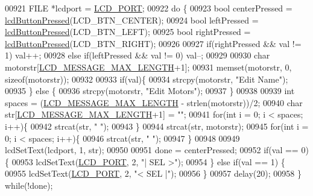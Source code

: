 \begin{DoxyCode}
{{{{{{{{{{{{{{00921     FILE *lcdport = \hyperlink{lcdmsg_8h_abcf42bd88b3c36193f301ca25b033875}{LCD\_PORT};
00922     \textcolor{keywordflow}{do} \{
00923         \textcolor{keywordtype}{bool} centerPressed = \hyperlink{lcddiag_8h_a74e4c744db49f9b7b645095575e152ad}{lcdButtonPressed}(LCD\_BTN\_CENTER);
00924         \textcolor{keywordtype}{bool} leftPressed = \hyperlink{lcddiag_8h_a74e4c744db49f9b7b645095575e152ad}{lcdButtonPressed}(LCD\_BTN\_LEFT);
00925         \textcolor{keywordtype}{bool} rightPressed = \hyperlink{lcddiag_8h_a74e4c744db49f9b7b645095575e152ad}{lcdButtonPressed}(LCD\_BTN\_RIGHT);
00926 
00927         \textcolor{keywordflow}{if}(rightPressed && val != 1) val++;
00928         \textcolor{keywordflow}{else} \textcolor{keywordflow}{if}(leftPressed && val != 0) val--;
00929 
00930         \textcolor{keywordtype}{char} motorstr[\hyperlink{lcdmsg_8h_abe4c4b70fc6f44ae3680e5b2c68cdd00}{LCD\_MESSAGE\_MAX\_LENGTH}+1];
00931         memset(motorstr, 0, \textcolor{keyword}{sizeof}(motorstr));
00932 
00933         \textcolor{keywordflow}{if}(val)\{
00934             strcpy(motorstr, \textcolor{stringliteral}{"Edit Name"});
00935         \} \textcolor{keywordflow}{else} \{
00936             strcpy(motorstr, \textcolor{stringliteral}{"Edit Motors"});
00937         \}
00938 
00939         \textcolor{keywordtype}{int} spaces = (\hyperlink{lcdmsg_8h_abe4c4b70fc6f44ae3680e5b2c68cdd00}{LCD\_MESSAGE\_MAX\_LENGTH} - strlen(motorstr))/2;
00940         \textcolor{keywordtype}{char} str[\hyperlink{lcdmsg_8h_abe4c4b70fc6f44ae3680e5b2c68cdd00}{LCD\_MESSAGE\_MAX\_LENGTH}+1] = \textcolor{stringliteral}{""};
00941         \textcolor{keywordflow}{for}(\textcolor{keywordtype}{int} i = 0; i < spaces; i++)\{
00942             strcat(str, \textcolor{stringliteral}{" "});
00943         \}
00944         strcat(str, motorstr);
00945         \textcolor{keywordflow}{for}(\textcolor{keywordtype}{int} i = 0; i < spaces; i++)\{
00946             strcat(str, \textcolor{stringliteral}{" "});
00947         \}
00948 
00949         lcdSetText(lcdport, 1, str);
00950 
00951         done = centerPressed;
00952         \textcolor{keywordflow}{if}(val == 0)\{
00953             lcdSetText(\hyperlink{lcdmsg_8h_abcf42bd88b3c36193f301ca25b033875}{LCD\_PORT}, 2, \textcolor{stringliteral}{"|      SEL     >"});
00954         \} \textcolor{keywordflow}{else} \textcolor{keywordflow}{if}(val == 1) \{
00955             lcdSetText(\hyperlink{lcdmsg_8h_abcf42bd88b3c36193f301ca25b033875}{LCD\_PORT}, 2, \textcolor{stringliteral}{"<      SEL     |"});
00956         \}
00957         delay(20);
00958     \} \textcolor{keywordflow}{while}(!done);
}}}}}}}}}}}}}}
\end{DoxyCode}
